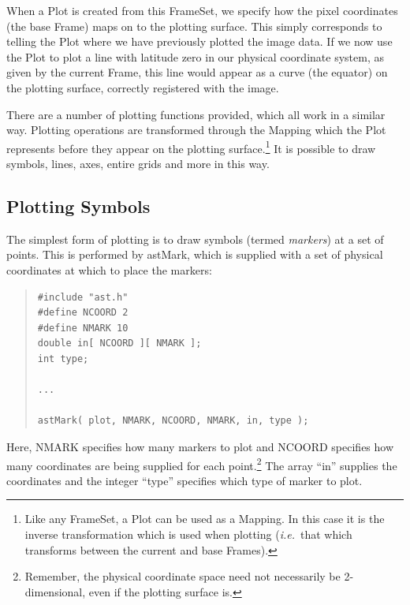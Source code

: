 \documentclass[twoside,11pt]{article}
\newcommand{\htmlref}[2]{#1}
\begin{document}
When a Plot is created from this FrameSet, we specify how the pixel
coordinates (the base Frame) maps on to the plotting surface. This
simply corresponds to telling the Plot where we have previously
plotted the image data. If we now use the Plot to plot a line with
latitude zero in our physical coordinate system, as given by the
current Frame, this line would appear as a curve (the equator) on the
plotting surface, correctly registered with the image.

There are a number of plotting functions provided, which all work in a
similar way. Plotting operations are transformed through the Mapping
which the Plot represents before they appear on the plotting
surface.\footnote{Like any FrameSet, a Plot can be used as a
Mapping. In this case it is the inverse transformation which is used
when plotting ({\em{i.e.}}\ that which transforms between the current
and base Frames).}  It is possible to draw symbols, lines, axes,
entire grids and more in this way.


\subsection{Plotting Symbols}

The simplest form of plotting is to draw symbols (termed
{\em{markers}}) at a set of points. This is performed by \htmlref{astMark}{astMark},
which is supplied with a set of physical coordinates at which to place
the markers:

\begin{quote}
\small
\begin{verbatim}
#include "ast.h"
#define NCOORD 2
#define NMARK 10
double in[ NCOORD ][ NMARK ];
int type;

...

astMark( plot, NMARK, NCOORD, NMARK, in, type );
\end{verbatim}
\normalsize
\end{quote}

Here, NMARK specifies how many markers to plot and NCOORD specifies
how many coordinates are being supplied for each
point.\footnote{Remember, the physical coordinate space need not
necessarily be 2-dimensional, even if the plotting surface is.} The
array ``in'' supplies the coordinates and the integer ``type''
specifies which type of marker to plot.
\end{document}
